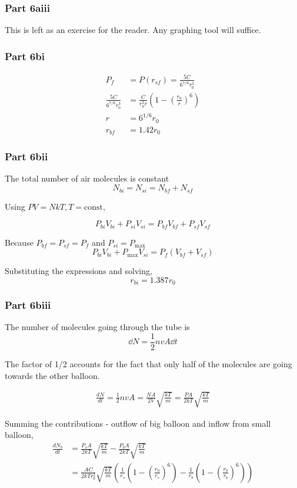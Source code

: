 \documentclass{article}
\begin{document}
\subsubsection{Part 6aiii}
This is left as an exercise for the reader. Any graphing tool will suffice.

\subsubsection{Part 6bi}
\begin{align}
    P_f &= P(r_{sf}) = \frac{5C}{6^{7/6}r_0^3} \\
    \frac{5C}{6^{7/6}r_0^3}  &= \frac{C}{r_0^2 r}\left(1-\left(\frac{r_0}{r}\right)^6\right) \\
    r &= 6^{1/6} r_0 \\
    r_{bf} &= 1.42 r_0
\end{align}

\subsubsection{Part 6bii}
The total number of air molecules is constant
\[N_{bi} = N_{si} = N_{bf} + N_{sf}\]

Using $PV = NkT, T=\mathrm{const}$,

\[P_{bi}V_{bi} + P_{si}V_{si} = P_{bf}V_{bf}+ P_{sf}V_{sf} \]

Because $P_{bf} = P_{sf} = P_f$ and $P_{si}=P_{\max}$
\[P_{bi}V_{bi}+P_{\max}V_{si} = P_f(V_{bf} + V_{sf})\]

Substituting the expressions and solving,
\[r_{bi} = 1.387 r_0\]

\subsubsection{Part 6biii}
The number of molecules going through the tube is
\[\dd{N} = \frac{1}{2} nvA\dd{t}\]

The factor of 1/2 accounts for the fact that only half of the molecules are going towards the other balloon.

\begin{align}
    \frac{dN}{dt} = \frac{1}{2} nvA = \frac{NA}{2V} \sqrt{\frac{kT}{m}} = \frac{PA}{2kT} \sqrt{\frac{kT}{m}} 
\end{align}

Summing the contributions - outflow of big balloon and inflow from small balloon,
\begin{align}
    \frac{dN_b}{dt} &= \frac{P_sA}{2kT} \sqrt{\frac{kT}{m}} - \frac{P_bA}{2kT} \sqrt{\frac{kT}{m}} \\
    &= \frac{AC}{2kT r_0^2} \sqrt{\frac{kT}{m}} \left( 
        \frac{1}{r_s} \left( 1 - \left(\frac{r_0}{r_s}\right)^6 \right) -
        \frac{1}{r_b} \left( 1 - \left(\frac{r_0}{r_b}\right)^6 \right)
    \right)
\end{align}
\end{document}
